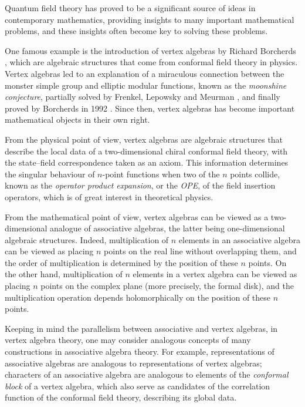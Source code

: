 Quantum field theory has proved to be
a significant source of ideas in contemporary mathematics,
providing insights to many important mathematical problems,
and these insights often become key to solving these problems.

One famous example is the introduction of
vertex algebras by Richard Borcherds \cite{borcherds86},
which are algebraic structures that
come from conformal field theory in physics.
Vertex algebras led to an explanation of a miraculous connection
between the monster simple group and elliptic modular functions,
known as the \emph{moonshine conjecture},
partially solved by Frenkel, Lepowsky and Meurman \cite{flm},
and finally proved by Borcherds in 1992 \cite{borcherds92}.
Since then, vertex algebras has become
important mathematical objects in their own right.

From the physical point of view,
vertex algebras are algebraic structures
that describe the local data of a
two-dimensional chiral conformal field theory,
with the state--field correspondence taken as an axiom.
This information determines the
singular behaviour of $n$-point functions
when two of the $n$ points collide,
known as the \emph{operator product expansion},
or the \emph{OPE}, of the field insertion operators,
which is of great interest in theoretical physics.

From the mathematical point of view,
vertex algebras can be viewed as a two-dimensional analogue
of associative algebras, the latter being one-dimensional algebraic structures.
Indeed, multiplication of $n$ elements in an associative algebra
can be viewed as placing $n$ points on the real line
without overlapping them,
and the order of multiplication is determined by the
position of these $n$ points.
On the other hand, multiplication of $n$ elements in a vertex algebra
can be viewed as placing $n$ points on the complex plane
(more precisely, the formal disk),
and the multiplication operation depends holomorphically
on the position of these $n$ points.

Keeping in mind the parallelism between associative and vertex algebras,
in vertex algebra theory, one may consider analogous concepts of
many constructions in associative algebra theory.
For example, representations of associative algebras
are analogous to representations of vertex algebras;
characters of an associative algebra
are analogous to elements of the \emph{conformal block} of a vertex algebra,
which also serve as candidates of the correlation function
of the conformal field theory,
describing its global data.


